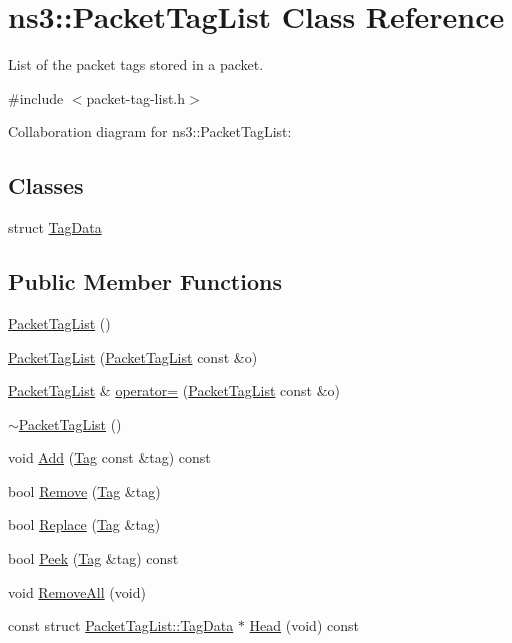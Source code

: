 \hypertarget{classns3_1_1PacketTagList}{}\section{ns3\+:\+:Packet\+Tag\+List Class Reference}
\label{classns3_1_1PacketTagList}


List of the packet tags stored in a packet.  




{\ttfamily \#include $<$packet-\/tag-\/list.\+h$>$}



Collaboration diagram for ns3\+:\+:Packet\+Tag\+List\+:
\subsection*{Classes}
\begin{DoxyCompactItemize}
\item 
struct \hyperlink{structns3_1_1PacketTagList_1_1TagData}{Tag\+Data}
\end{DoxyCompactItemize}
\subsection*{Public Member Functions}
\begin{DoxyCompactItemize}
\item 
\hyperlink{classns3_1_1PacketTagList_a9fb30fea59b079ce7bccdae5fbeb0717}{Packet\+Tag\+List} ()
\item 
\hyperlink{classns3_1_1PacketTagList_a45afac90475e8606e9333a7a0f659d56}{Packet\+Tag\+List} (\hyperlink{classns3_1_1PacketTagList}{Packet\+Tag\+List} const \&o)
\item 
\hyperlink{classns3_1_1PacketTagList}{Packet\+Tag\+List} \& \hyperlink{classns3_1_1PacketTagList_a9f9ad2ae05a714508437cbeca700fe77}{operator=} (\hyperlink{classns3_1_1PacketTagList}{Packet\+Tag\+List} const \&o)
\item 
\hyperlink{classns3_1_1PacketTagList_adcbf1a29541b5e35bf42a16ca604d7ae}{$\sim$\+Packet\+Tag\+List} ()
\item 
void \hyperlink{classns3_1_1PacketTagList_a37f008b6f336f3ac6232d558b93e8a6e}{Add} (\hyperlink{classns3_1_1Tag}{Tag} const \&tag) const 
\item 
bool \hyperlink{classns3_1_1PacketTagList_a043d984c546f67adc273448747784ee3}{Remove} (\hyperlink{classns3_1_1Tag}{Tag} \&tag)
\item 
bool \hyperlink{classns3_1_1PacketTagList_a6a6bc266832b2cead6cf42e3daee1041}{Replace} (\hyperlink{classns3_1_1Tag}{Tag} \&tag)
\item 
bool \hyperlink{classns3_1_1PacketTagList_a49151e3dbbddac7820d2210bbde47c4b}{Peek} (\hyperlink{classns3_1_1Tag}{Tag} \&tag) const 
\item 
void \hyperlink{classns3_1_1PacketTagList_a798eb1d77415704e948194564d0eaa4e}{Remove\+All} (void)
\item 
const struct \hyperlink{structns3_1_1PacketTagList_1_1TagData}{Packet\+Tag\+List\+::\+Tag\+Data} $\ast$ \hyperlink{classns3_1_1PacketTagList_a134ba1f369de24c2a5bea79bbfec16d3}{Head} (void) const 
\end{DoxyCompactItemize}
